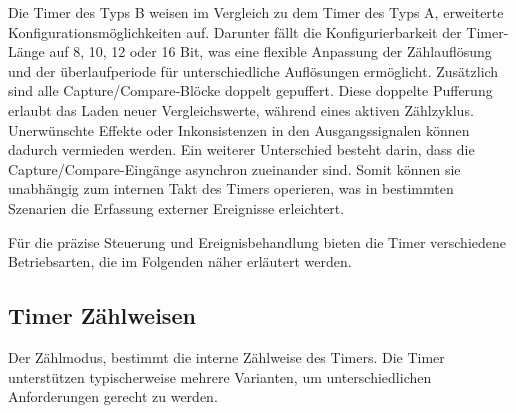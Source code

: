 Die Timer des Typs B weisen im Vergleich zu dem Timer des Typs A, erweiterte Konfigurationsm\"oglichkeiten auf. Darunter f\"allt die Konfigurierbarkeit der Timer-L\"ange auf 8, 10, 12 oder 16 Bit, was eine flexible Anpassung der Z\"ahlaufl\"osung und der \"uberlaufperiode f\"ur unterschiedliche Aufl\"osungen erm\"oglicht. Zus\"atzlich sind alle Capture/Compare-Bl\"ocke doppelt gepuffert. Diese doppelte Pufferung erlaubt das Laden neuer Vergleichswerte, w\"ahrend eines aktiven Z\"ahlzyklus. Unerw\"unschte Effekte oder Inkonsistenzen in den Ausgangssignalen k\"onnen dadurch vermieden werden. Ein weiterer Unterschied besteht darin, dass die Capture/Compare-Eing\"ange asynchron zueinander sind. Somit k\"onnen sie unabh\"angig zum internen Takt des Timers operieren, was in bestimmten Szenarien die Erfassung externer Ereignisse erleichtert. 

F\"ur die pr\"azise Steuerung und Ereignisbehandlung bieten die Timer verschiedene Betriebsarten, die im Folgenden n\"aher erl\"autert werden.

\newpage
\subsection{Timer Z\"ahlweisen}
\label{sec:Timer_CountMode}

Der Z\"ahlmodus, bestimmt die interne Z\"ahlweise des Timers. Die Timer unterst\"utzen typischerweise mehrere Varianten, um unterschiedlichen Anforderungen gerecht zu werden. 

